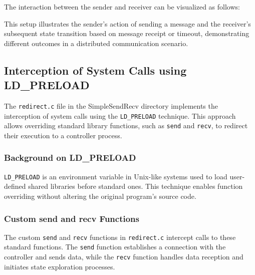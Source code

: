\documentclass[a4paper,11pt,oneside]{report}
\begin{document}
The interaction between the sender and receiver can be visualized as follows:


This setup illustrates the sender's action of sending a message and the receiver's subsequent state transition based on message receipt or timeout, demonstrating different outcomes in a distributed communication scenario.

\subsection{Interception of System Calls using LD\_PRELOAD}
The \texttt{redirect.c} file in the SimpleSendRecv directory implements the interception of system calls using the \texttt{LD\_PRELOAD} technique. This approach allows overriding standard library functions, such as \texttt{send} and \texttt{recv}, to redirect their execution to a controller process.

\subsubsection{Background on LD\_PRELOAD}
\texttt{LD\_PRELOAD} is an environment variable in Unix-like systems used to load user-defined shared libraries before standard ones. This technique enables function overriding without altering the original program's source code.

\subsubsection{Custom send and recv Functions}
The custom \texttt{send} and \texttt{recv} functions in \texttt{redirect.c} intercept calls to these standard functions. The \texttt{send} function establishes a connection with the controller and sends data, while the \texttt{recv} function handles data reception and initiates state exploration processes.
\end{document}
